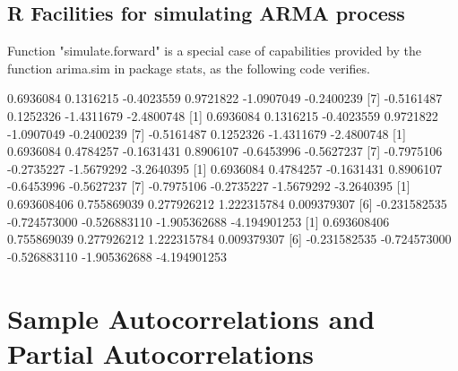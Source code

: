 \documentclass[a4paper]{article}
\renewcommand{\~}{\perispomeni}%
\begin{document}
\subsection{R Facilities for simulating ARMA process}
Function "simulate.forward" is a special case of capabilities provided by
the function arima.sim in package stats, as the following code verifies.
\begin{Schunk}
\begin{Soutput}
 [1]  0.6936084  0.1316215 -0.4023559  0.9721822 -1.0907049 -0.2400239
 [7] -0.5161487  0.1252326 -1.4311679 -2.4800748
 [1]  0.6936084  0.1316215 -0.4023559  0.9721822 -1.0907049 -0.2400239
 [7] -0.5161487  0.1252326 -1.4311679 -2.4800748
 [1]  0.6936084  0.4784257 -0.1631431  0.8906107 -0.6453996 -0.5627237
 [7] -0.7975106 -0.2735227 -1.5679292 -3.2640395
 [1]  0.6936084  0.4784257 -0.1631431  0.8906107 -0.6453996 -0.5627237
 [7] -0.7975106 -0.2735227 -1.5679292 -3.2640395
 [1]  0.693608406  0.755869039  0.277926212  1.222315784  0.009379307
 [6] -0.231582535 -0.724573000 -0.526883110 -1.905362688 -4.194901253
 [1]  0.693608406  0.755869039  0.277926212  1.222315784  0.009379307
 [6] -0.231582535 -0.724573000 -0.526883110 -1.905362688 -4.194901253
\end{Soutput}
\end{Schunk}
\section{Sample Autocorrelations and Partial Autocorrelations}
\end{document}

